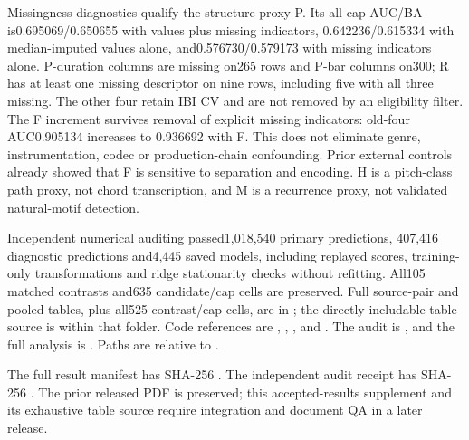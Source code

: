 Missingness diagnostics qualify the structure proxy P. Its all-cap AUC/BA
is0.695069/0.650655 with values plus missing indicators,
0.642236/0.615334 with median-imputed values alone, and0.576730/0.579173
with missing indicators alone. P-duration columns are missing on265 rows and
P-bar columns on300; R has at least one missing descriptor on nine rows,
including five with all three missing. The other four retain IBI CV and are
not removed by an eligibility filter. The F increment survives
removal of explicit missing indicators: old-four AUC0.905134 increases to
0.936692 with F. This does not eliminate genre, instrumentation, codec or
production-chain confounding. Prior external controls already showed that F
is sensitive to separation and encoding. H is a pitch-class path proxy, not
chord transcription, and M is a recurrence proxy, not validated natural-motif
detection.

Independent numerical auditing passed1,018,540 primary predictions,
407,416 diagnostic predictions and4,445 saved models, including replayed
scores, training-only transformations and ridge stationarity checks without
refitting. All105 matched contrasts and635 candidate/cap cells are preserved.
Full source-pair and pooled tables, plus all525 contrast/cap cells, are in
; the directly includable
table source is  within that folder.
Code references are ,
,
, and
. The audit is
, and the full analysis
is . Paths are relative to
.

The full result manifest has SHA-256
.
The independent audit receipt has SHA-256
.
The prior released PDF is preserved; this accepted-results supplement and its
exhaustive table source require integration and document QA in a later release.
